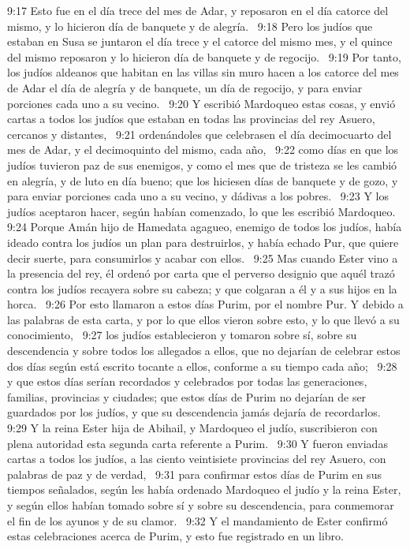 9:17 Esto fue en el día trece del mes de Adar, y reposaron en el día catorce del mismo, y lo hicieron día de banquete y de alegría.  
9:18 Pero los judíos que estaban en Susa se juntaron el día trece y el catorce del mismo mes, y el quince del mismo reposaron y lo hicieron día de banquete y de regocijo.  
9:19 Por tanto, los judíos aldeanos que habitan en las villas sin muro hacen a los catorce del mes de Adar el día de alegría y de banquete, un día de regocijo, y para enviar porciones cada uno a su vecino.  
9:20 Y escribió Mardoqueo estas cosas, y envió cartas a todos los judíos que estaban en todas las provincias del rey Asuero, cercanos y distantes,  
9:21 ordenándoles que celebrasen el día decimocuarto del mes de Adar, y el decimoquinto del mismo, cada año,  
9:22 como días en que los judíos tuvieron paz de sus enemigos, y como el mes que de tristeza se les cambió en alegría, y de luto en día bueno; que los hiciesen días de banquete y de gozo, y para enviar porciones cada uno a su vecino, y dádivas a los pobres.  
9:23 Y los judíos aceptaron hacer, según habían comenzado, lo que les escribió Mardoqueo.  
9:24 Porque Amán hijo de Hamedata agagueo, enemigo de todos los judíos, había ideado contra los judíos un plan para destruirlos, y había echado Pur, que quiere decir suerte, para consumirlos y acabar con ellos.  
9:25 Mas cuando Ester vino a la presencia del rey, él ordenó por carta que el perverso designio que aquél trazó contra los judíos recayera sobre su cabeza; y que colgaran a él y a sus hijos en la horca.  
9:26 Por esto llamaron a estos días Purim, por el nombre Pur. Y debido a las palabras de esta carta, y por lo que ellos vieron sobre esto, y lo que llevó a su conocimiento,  
9:27 los judíos establecieron y tomaron sobre sí, sobre su descendencia y sobre todos los allegados a ellos, que no dejarían de celebrar estos dos días según está escrito tocante a ellos, conforme a su tiempo cada año;  
9:28 y que estos días serían recordados y celebrados por todas las generaciones, familias, provincias y ciudades; que estos días de Purim no dejarían de ser guardados por los judíos, y que su descendencia jamás dejaría de recordarlos.  
9:29 Y la reina Ester hija de Abihail, y Mardoqueo el judío, suscribieron con plena autoridad esta segunda carta referente a Purim.  
9:30 Y fueron enviadas cartas a todos los judíos, a las ciento veintisiete provincias del rey Asuero, con palabras de paz y de verdad,  
9:31 para confirmar estos días de Purim en sus tiempos señalados, según les había ordenado Mardoqueo el judío y la reina Ester, y según ellos habían tomado sobre sí y sobre su descendencia, para conmemorar el fin de los ayunos y de su clamor.  
9:32 Y el mandamiento de Ester confirmó estas celebraciones acerca de Purim, y esto fue registrado en un libro.  
